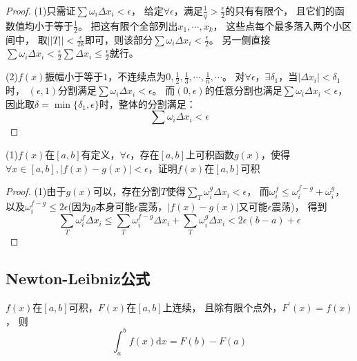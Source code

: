 \begin{proof}
  (1)只需证$\sum \omega_i \Delta x_i < \epsilon$，
  给定$\forall \epsilon$，满足$\frac{1}{q} > \frac{\epsilon}{2}$的只有有限个，
  且它们的函数值均小于等于$\frac{1}{2}$。
  把这有限个全部列出$x_1, \cdots, x_k$，
  这些点每个最多落入两个小区间中，
  取$||T|| < \frac{\epsilon}{2k}$即可，则该部分$\sum \omega_i \Delta x_i < \frac{\epsilon}{2}$。
  另一侧直接$\sum \omega_i \Delta x_i < \frac{\epsilon}{2} \sum \Delta x_i \leq \frac{\epsilon}{2}$就行。

  (2)$f(x)$振幅小于等于$1$，不连续点为$0,\frac{1}{2},\frac{1}{3},\cdots,\frac{1}{n},\cdots$。
  对$\forall \epsilon$，$\exists \delta_1$，当$|\Delta x_i| < \delta_1$时，
  $(\epsilon, 1)$分割满足$\sum \omega_i \Delta x_i < \epsilon$。
  而$(0,\epsilon)$的任意分割也满足$\sum \omega_i \Delta x_i < \epsilon$，
  因此取$\delta = \min \{\delta_1,\epsilon\}$时，整体的分割满足：
  \begin{equation*}
    \sum \omega_i \Delta x_i < \epsilon
  \end{equation*}
\end{proof}

\begin{exercise}[可积性相关证明]
  (1)$f(x)$在$[a,b]$有定义，$\forall \epsilon$，存在$[a,b]$上可积函数$g(x)$，使得$\forall x \in [a,b], |f(x) - g(x)| < \epsilon$，证明$f(x)$在$[a,b]$可积
\end{exercise}

\begin{proof}
  (1)由于$g(x)$可以，存在分割$T$使得$\sum\limits_T \omega_i^g \Delta x_i < \epsilon$，
  而$\omega_i^f \leq \omega_i^{f-g} + \omega_i^g$，
  以及$\omega_i^{f-g} \leq 2\epsilon$(因为$g$本身可能$\epsilon$震荡，$|f(x)-g(x)|$又可能$\epsilon$震荡)，
  得到
  \begin{equation*}
    \sum\limits_T \omega_i^f \Delta x_i \leq \sum\limits_T \omega_i^{f-g} \Delta x_i + \sum\limits_T \omega_i^g \Delta x_i < 2 \epsilon(b - a) + \epsilon
  \end{equation*}
\end{proof}

\subsection{Newton-Leibniz公式}

\begin{theorem}
  $f(x)$在$[a,b]$可积，$F(x)$在$[a,b]$上连续，
  且除有限个点外，$F^{\prime}(x) = f(x)$，
  则
  \begin{equation*}
    \int_a^b f(x)\mathrm{d} x = F(b) - F(a)
  \end{equation*}
\end{theorem}

